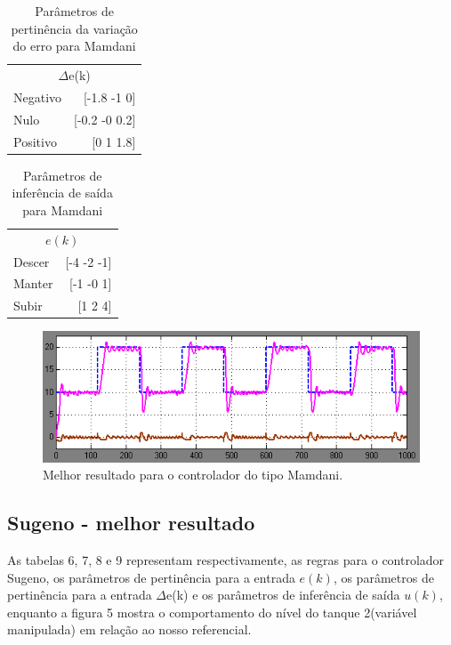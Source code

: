 \documentclass[conference]{IEEEtran}
\begin{document}
\begin{table}[!ht]
\caption{Parâmetros de pertinência da variação do erro para Mamdani}
\centering
\begin{tabular}{lr}
\toprule
\multicolumn{2}{c}{$\Delta$e(k)} \\
\cmidrule(r){1-2}
Negativo & [-1.8 -1 0] \\
Nulo & [-0.2 -0 0.2] \\
Positivo & [0 1 1.8] \\
\bottomrule
\end{tabular}
\end{table}

\begin{table}[!ht]
\caption{Parâmetros de inferência de saída para Mamdani}
\centering
\begin{tabular}{lr}
\toprule
\multicolumn{2}{c}{$e(k)$} \\
\cmidrule(r){1-2}
Descer & [-4 -2 -1] \\
Manter & [-1 -0 1] \\
Subir & [1 2 4] \\
\bottomrule
\end{tabular}
\end{table}

\begin{figure}[!ht]
    \centering
    \includegraphics[scale=0.2]{mamdani1.png}
    \caption { Melhor resultado para o controlador do tipo Mamdani. }
\end{figure}

\subsection{Sugeno - melhor resultado}

As tabelas 6, 7, 8 e 9 representam respectivamente, as regras para o controlador Sugeno, os parâmetros de pertinência para a entrada $e(k)$, os parâmetros de pertinência  para a entrada $\Delta$e(k) e os parâmetros de inferência de saída $u(k)$, enquanto a figura 5 mostra o comportamento do nível do tanque 2(variável manipulada) em relação ao nosso referencial.
\end{document}
